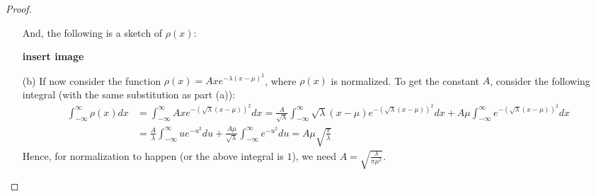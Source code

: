 \documentclass{article}
\begin{document}
\begin{proof}
\begin{itemize}
        And, the following is a sketch of $\rho(x)$:

        \textbf{insert image}

        \item[(b)] If now consider the function $\rho(x)=A xe^{-\lambda(x-\mu)^2}$, where $\rho(x)$ is normalized. To get the constant $A$, consider the following integral (with the same substitution as part (a)):
        \begin{align}
            \int_{-\infty}^{\infty}\rho(x)dx &= \int_{-\infty}^{\infty}A xe^{-(\sqrt{\lambda}(x-\mu))^2}dx = \frac{A}{\sqrt{\lambda}}\int_{-\infty}^{\infty}\sqrt{\lambda}(x-\mu)e^{-(\sqrt{\lambda}(x-\mu))^2}dx + A\mu\int_{-\infty}^{\infty}e^{-(\sqrt{\lambda}(x-\mu))^2}dx\\
            &= \frac{A}{\lambda}\int_{-\infty}^{\infty}ue^{-u^2}du + \frac{A\mu}{\sqrt{\lambda}}\int_{-\infty}^{\infty}e^{-u^2}du = A\mu\sqrt{\frac{\pi}{\lambda}}
        \end{align}
        Hence, for normalization to happen (or the above integral is $1$), we need $A=\sqrt{\frac{\lambda}{\pi \mu^2}}$.

        \hfil


\end{itemize}
\end{proof}
\end{document}
